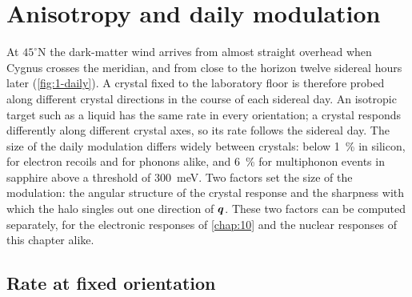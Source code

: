 \section{Anisotropy and daily modulation}\label{sec:11.7}

At $45^\circ$N the dark-matter wind arrives from almost straight overhead when Cygnus crosses the meridian, and from close to the horizon twelve sidereal hours later (\cref{fig:1-daily}). A crystal fixed to the laboratory floor is therefore probed along different crystal directions in the course of each sidereal day. An isotropic target such as a liquid has the same rate in every orientation; a crystal responds differently along different crystal axes, so its rate follows the sidereal day. The size of the daily modulation differs widely between crystals: below \SI{1}{\percent} in silicon, for electron recoils and for phonons alike, and \SI{6}{\percent} for multiphonon events in sapphire above a threshold of \SI{300}{meV}. Two factors set the size of the modulation: the angular structure of the crystal response and the sharpness with which the halo singles out one direction of $\bm{q}$. These two factors can be computed separately, for the electronic responses of \cref{chap:10} and the nuclear responses of this chapter alike.

\subsection{Rate at fixed orientation}

